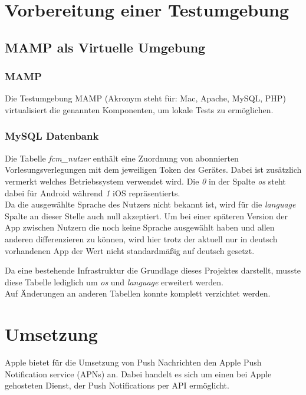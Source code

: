 \newpage


\section{Vorbereitung einer Testumgebung}

\subsection{MAMP als Virtuelle Umgebung}

\subsubsection{MAMP}
Die Testumgebung MAMP (Akronym steht für: Mac, Apache, MySQL, PHP) virtualisiert die genannten Komponenten, um lokale Tests zu ermöglichen.


\subsubsection{MySQL Datenbank}

Die Tabelle \textit{fcm\_nutzer} enthält eine Zuordnung von abonnierten Vorlesungsverlegungen mit dem jeweiligen Token des Gerätes. Dabei ist zusätzlich vermerkt welches Betriebssystem verwendet wird. Die \textit{0} in der Spalte \textit{os} steht dabei für Android während \textit{1} iOS repräsentierts. \\
Da die ausgewählte Sprache des Nutzers nicht bekannt ist, wird für die \textit{language} Spalte an dieser Stelle auch null akzeptiert. Um bei einer späteren Version der App zwischen Nutzern die noch keine Sprache ausgewählt haben und allen anderen differenzieren zu können, wird hier trotz der aktuell nur in deutsch vorhandenen App der Wert nicht standardmäßig auf deutsch gesetzt.

Da eine bestehende Infrastruktur die Grundlage dieses Projektes darstellt, musste diese Tabelle lediglich um \textit{os} und \textit{language} erweitert werden.\\
Auf Änderungen an anderen Tabellen konnte komplett verzichtet werden.




\section{Umsetzung}
Apple bietet für die Umsetzung von Push Nachrichten den Apple Push Notification service (APNs) an. Dabei handelt es sich um einen bei Apple gehosteten Dienst, der Push Notifications per API ermöglicht.


